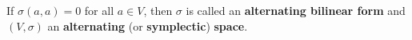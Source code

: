If $\sigma(a, a) = 0$ for all $a \in V$, then $\sigma$ is called an \textbf{alternating bilinear form} and $(V, \sigma)$ an \textbf{alternating} (or \textbf{symplectic}) \textbf{space}.
